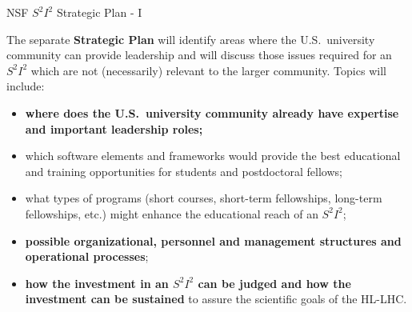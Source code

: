 \documentclass[compress,10]{beamer}
\begin{document}
\begin{frame}[fragile]{NSF $S^2 I^2 $ Strategic Plan - I }{}
{\footnotesize
The separate {\bf Strategic Plan} will identify areas where the 
U.S.\ university
community can provide leadership and will discuss
those issues required for an $ S^2 I^2 $
which are not (necessarily) relevant to the larger community.
Topics will include:
 \begin{itemize}
   \item
     \textcolor{brickred}{\bf
     where does the U.S.\ university community already have
     expertise and important leadership roles;}
   \item
     which software elements and frameworks would provide
     the best educational and training opportunities
     for students and postdoctoral fellows;
   \item
     what  types of programs (short courses, short-term
     fellowships, long-term fellowships, etc.)
     might enhance the educational
     reach of an $ S^2 I^2 $;
   \item
     \textcolor{brickred}{\bf
     possible organizational, personnel and management
     structures and operational processes};
    \item
     \textcolor{brickred}{\bf
     how the investment in an $ S^2 I^2 $ can be judged
     and how the investment can be sustained}
     to assure the scientific goals of the HL-LHC.
 \end{itemize}

}  %

\end{frame}
\end{document}
